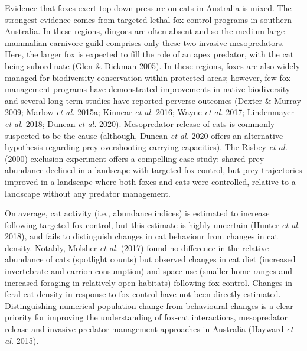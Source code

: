 \documentclass[11pt,a4paper,titlepage,twoside,openright]{style/unimelbthesis}
\begin{document}
\begin{mainmatter}
Evidence that foxes exert top-down pressure on cats in Australia is mixed. The strongest evidence comes from targeted lethal fox control programs in southern Australia. In these regions, dingoes are often absent and so the medium-large mammalian carnivore guild comprises only these two invasive mesopredators. Here, the larger fox is expected to fill the role of an apex predator, with the cat being subordinate (Glen \& Dickman 2005). In these regions, foxes are also widely managed for biodiversity conservation within protected areas; however, few fox management programs have demonstrated improvements in native biodiversity and several long-term studies have reported perverse outcomes (Dexter \& Murray 2009; Marlow \emph{et al.} 2015a; Kinnear \emph{et al.} 2016; Wayne \emph{et al.} 2017; Lindenmayer \emph{et al.} 2018; Duncan \emph{et al.} 2020). Mesopredator release of cats is commonly suspected to be the cause (although, Duncan \emph{et al.} 2020 offers an alternative hypothesis regarding prey overshooting carrying capacities). The Risbey \emph{et al.} (2000) exclusion experiment offers a compelling case study: shared prey abundance declined in a landscape with targeted fox control, but prey trajectories improved in a landscape where both foxes and cats were controlled, relative to a landscape without any predator management.

On average, cat activity (i.e., abundance indices) is estimated to increase following targeted fox control, but this estimate is highly uncertain (Hunter \emph{et al.} 2018), and fails to distinguish changes in cat behaviour from changes in cat density. Notably, Molsher \emph{et al.} (2017) found no difference in the relative abundance of cats (spotlight counts) but observed changes in cat diet (increased invertebrate and carrion consumption) and space use (smaller home ranges and increased foraging in relatively open habitats) following fox control. Changes in feral cat density in response to fox control have not been directly estimated. Distinguishing numerical population change from behavioural changes is a clear priority for improving the understanding of fox-cat interactions, mesopredator release and invasive predator management approaches in Australia (Hayward \emph{et al.} 2015).


\end{mainmatter}
\end{document}
